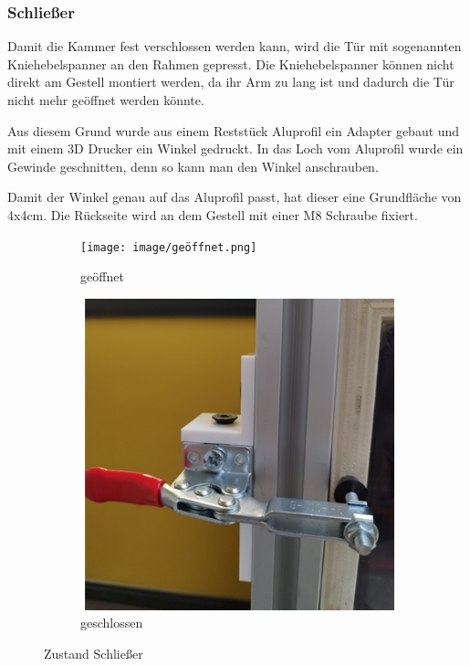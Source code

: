 \subsubsection{Schließer}
Damit die Kammer fest verschlossen werden kann, wird die Tür mit sogenannten Kniehebelspanner an den Rahmen gepresst.
Die Kniehebelspanner können nicht direkt am Gestell montiert werden, da ihr Arm zu lang ist und dadurch die Tür nicht mehr geöffnet werden könnte.
\begin{figwindow}
Aus diesem Grund wurde aus einem Reststück Aluprofil ein Adapter gebaut und mit einem 3D Drucker ein Winkel gedruckt. In das Loch vom Aluprofil wurde ein Gewinde geschnitten, denn so kann man den Winkel anschrauben.
\end{figwindow}
\vspace{20mm}
\begin{figwindow}
Damit der Winkel genau auf das Aluprofil passt, hat dieser eine Grundfläche von 4x4cm. Die Rückseite wird an dem Gestell mit einer M8 Schraube fixiert.
\end{figwindow}
\vspace{40mm}
\begin{figure}[H]
    \centering
    \begin{subfigure}[b]{0.4\textwidth}
        \centering
        \texttt{[image: image/geöffnet.png]}
        \caption{geöffnet}
        \label{fig:bild1}
    \end{subfigure}
    \hfill
    \begin{subfigure}[b]{0.45\textwidth}
        \centering
        \includegraphics[width=\textwidth]{image/geschlossen.png}
        \caption{geschlossen}
        \label{fig:bild2}
    \end{subfigure}
    \caption{Zustand Schließer}
    \label{fig:zwei_bilder}
\end{figure}